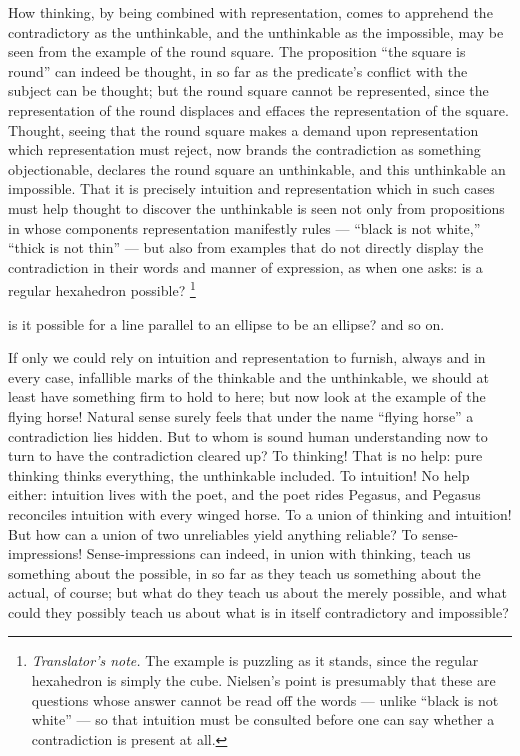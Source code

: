 \documentclass[12pt,a4paper]{book}
\renewcommand{\thefootnote}{\ifcase\value{footnote}\or *)\or **)\or ***)\fi}
\newcommand{\tnote}[1]{%
  \begingroup
  \renewcommand{\thefootnote}{\textdagger}%
  \footnote{\emph{Translator's note.} #1}%
  \addtocounter{footnote}{-1}%
  \endgroup}
\begin{document}
How thinking, by being combined with representation, comes to apprehend the
contradictory as the unthinkable, and the unthinkable as the impossible, may be
seen from the example of the round square. The proposition ``the square is
round'' can indeed be thought, in so far as the predicate's conflict with the
subject can be thought; but the round square cannot be represented, since the
representation of the round displaces and effaces the representation of the
square. Thought, seeing that the round square makes a demand upon
representation which representation must reject, now brands the contradiction
as something objectionable, declares the round square an unthinkable, and this
unthinkable an impossible. That it is precisely intuition and representation
which in such cases must help thought to discover the unthinkable is seen not
only from propositions in whose components representation manifestly rules ---
``black is not white,'' ``thick is not thin'' --- but also from examples that do
not directly display the contradiction in their words and manner of expression,
as when one asks: is
a regular hexahedron possible?\tnote{The example is puzzling as it stands,
since the regular hexahedron is simply the cube. Nielsen's point is presumably
that these are questions whose answer cannot be read off the words --- unlike
``black is not white'' --- so that intuition must be consulted before one can
say whether a contradiction is present at all.} is it possible for a line
parallel to an ellipse to be an ellipse? and so on.

If only we could rely on intuition and representation to furnish, always and in
every case, infallible marks of the thinkable and the unthinkable, we should at
least have something firm to hold to here; but now look at the example of the
flying horse! Natural sense surely feels that under the name ``flying horse'' a
contradiction lies hidden. But to whom is sound human understanding now to turn
to have the contradiction cleared up? To thinking! That is no help: pure
thinking thinks everything, the unthinkable included. To intuition! No help
either: intuition lives with the poet, and the poet rides Pegasus, and Pegasus
reconciles intuition with every winged horse. To a union of thinking and
intuition! But how can a union of two unreliables yield anything reliable? To
sense-impressions! Sense-impressions can indeed, in union with thinking, teach
us something about the possible, in so far as they teach us something about the
actual, of course; but what do they teach us about the merely possible, and
what could they possibly teach us about what is in itself contradictory and
impossible?
\end{document}
